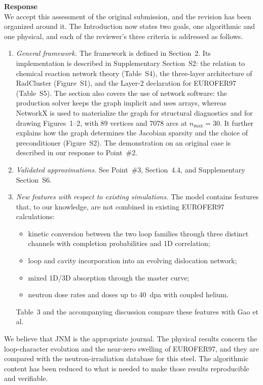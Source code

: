 \documentclass{article}
\begin{document}
\begin{itemize}
\textbf{Response}\\
We accept this assessment of the original submission, and the revision has been organized around it. The Introduction now states two goals, one algorithmic and one physical, and each of the reviewer's three criteria is addressed as follows.
\begin{enumerate}[label=(\alph*)]
    \item \emph{General framework.} The framework is defined in Section~2. Its implementation is described in Supplementary Section~S2: the relation to chemical reaction network theory (Table~S4), the three-layer architecture of RadCluster (Figure~S1), and the Layer-2 declaration for EUROFER97 (Table~S5). The section also covers the use of network software: the production solver keeps the graph implicit and uses arrays, whereas NetworkX is used to materialize the graph for structural diagnostics and for drawing Figures~1--2, with 89 vertices and 7078 arcs at $n_{\max}=30$. It further explains how the graph determines the Jacobian sparsity and the choice of preconditioner (Figure~S2). The demonstration on an original case is described in our response to Point~\#2.
    \item \emph{Validated approximations.} See Point~\#3, Section~4.4, and Supplementary Section~S6.
    \item \emph{New features with respect to existing simulations.} The model contains features that, to our knowledge, are not combined in existing EUROFER97 calculations:
    \begin{itemize}
        \item kinetic conversion between the two loop families through three distinct channels with completion probabilities and 1D correlation;
        \item loop and cavity incorporation into an evolving dislocation network;
        \item mixed 1D/3D absorption through the master curve;
        \item neutron dose rates and doses up to 40~dpa with coupled helium.
    \end{itemize}
    Table~3 and the accompanying discussion compare these features with Gao et al.
\end{enumerate}
We believe that JNM is the appropriate journal. The physical results concern the loop-character evolution and the near-zero swelling of EUROFER97, and they are compared with the neutron-irradiation database for this steel. The algorithmic content has been reduced to what is needed to make those results reproducible and verifiable.


\end{itemize}
\end{document}
